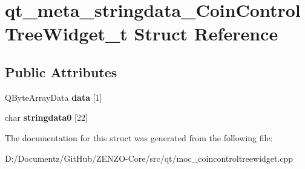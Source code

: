 \hypertarget{structqt__meta__stringdata___coin_control_tree_widget__t}{}\section{qt\+\_\+meta\+\_\+stringdata\+\_\+\+Coin\+Control\+Tree\+Widget\+\_\+t Struct Reference}
\label{structqt__meta__stringdata___coin_control_tree_widget__t}
\subsection*{Public Attributes}
\begin{DoxyCompactItemize}
\item 
\mbox{\label{structqt__meta__stringdata___coin_control_tree_widget__t_a124adde27443798b76fa68f2be0c8ef7}} 
Q\+Byte\+Array\+Data {\bfseries data} \mbox{[}1\mbox{]}
\item 
\mbox{\label{structqt__meta__stringdata___coin_control_tree_widget__t_acd43fbfbcb4071fccc84c9d684ffb01e}} 
char {\bfseries stringdata0} \mbox{[}22\mbox{]}
\end{DoxyCompactItemize}


The documentation for this struct was generated from the following file\+:\begin{DoxyCompactItemize}
\item 
D\+:/\+Documentz/\+Git\+Hub/\+Z\+E\+N\+Z\+O-\/\+Core/src/qt/moc\+\_\+coincontroltreewidget.\+cpp\end{DoxyCompactItemize}

